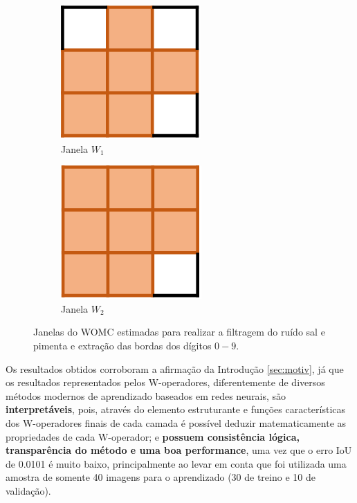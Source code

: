 \begin{figure}
  \centering

  \begin{subfigure}{0.4\textwidth}
    \centering
    \includegraphics[width=.4\textwidth]{figuras/wop_1.png}
    \caption{Janela $W_{1}$\label{fig:subfig:w1}}
  \end{subfigure}
  \begin{subfigure}{0.4\textwidth}
    \centering
      \includegraphics[width=.4\textwidth]{figuras/wop_2.png}
    \caption{Janela $W_{2}$\label{fig:subfig:w1}}
  \end{subfigure}

  \caption{Janelas do WOMC estimadas para realizar a filtragem do ruído sal e pimenta e extração das bordas dos dígitos $0-9$.\label{fig:WOMC}}
\end{figure}

Os resultados obtidos corroboram a afirmação da Introdução \ref{sec:motiv}, já que os resultados representados pelos W-operadores, diferentemente de diversos métodos modernos de aprendizado baseados em redes neurais, são \textbf{interpretáveis}, pois, através do elemento estruturante e funções características dos W-operadores finais de cada camada é possível deduzir matematicamente as propriedades de cada W-operador; e \textbf{possuem consistência lógica, transparência do método e uma boa performance}, uma vez que o erro IoU de 0.0101 é muito baixo, principalmente ao levar em conta que foi utilizada uma amostra de somente 40 imagens para o aprendizado (30 de treino e 10 de validação).

